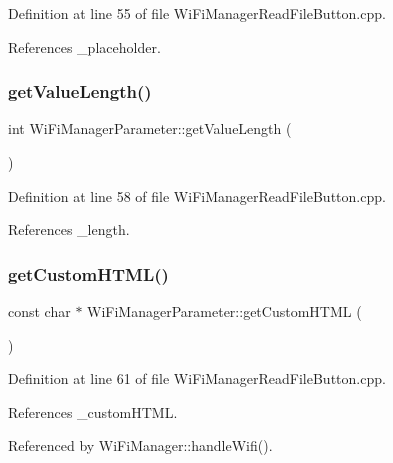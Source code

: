 Definition at line 55 of file Wi\+Fi\+Manager\+Read\+File\+Button.\+cpp.



References \+\_\+placeholder.

\mbox{\label{class_wi_fi_manager_parameter_a51715af23f9c067a73cc45fab7953606}} 
\subsubsection{\texorpdfstring{get\+Value\+Length()}{getValueLength()}}
{\footnotesize\ttfamily int Wi\+Fi\+Manager\+Parameter\+::get\+Value\+Length (\begin{DoxyParamCaption}{ }\end{DoxyParamCaption})}



Definition at line 58 of file Wi\+Fi\+Manager\+Read\+File\+Button.\+cpp.



References \+\_\+length.

\mbox{\label{class_wi_fi_manager_parameter_a596273c189eb40107500cee3ad31b13b}} 
\subsubsection{\texorpdfstring{get\+Custom\+H\+T\+M\+L()}{getCustomHTML()}}
{\footnotesize\ttfamily const char $\ast$ Wi\+Fi\+Manager\+Parameter\+::get\+Custom\+H\+T\+ML (\begin{DoxyParamCaption}{ }\end{DoxyParamCaption})}



Definition at line 61 of file Wi\+Fi\+Manager\+Read\+File\+Button.\+cpp.



References \+\_\+custom\+H\+T\+ML.



Referenced by Wi\+Fi\+Manager\+::handle\+Wifi().

